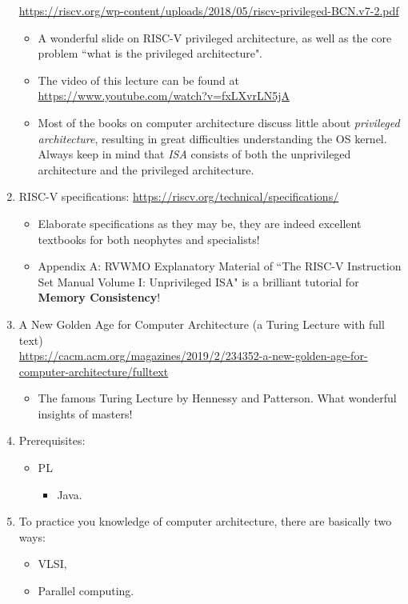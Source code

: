 \documentclass{article}
\begin{document}
\begin{enumerate}
    \href{https://riscv.org/wp-content/uploads/2018/05/riscv-privileged-BCN.v7-2.pdf}{https://riscv.org/wp-content/uploads/2018/05/riscv-privileged-BCN.v7-2.pdf}
    \begin{itemize}
        \item A wonderful slide on RISC-V privileged architecture, as well as the core problem ``what is the privileged architecture".
        \item The video of this lecture can be found at\\ \href{https://www.youtube.com/watch?v=fxLXvrLN5jA}{https://www.youtube.com/watch?v=fxLXvrLN5jA}
        \item Most of the books on computer architecture discuss little about \emph{privileged architecture}, resulting in great difficulties understanding the OS kernel.
        Always keep in mind that \emph{ISA} consists of both the unprivileged architecture and the privileged architecture.
    \end{itemize}
    \item RISC-V specifications:
    \href{https://riscv.org/technical/specifications/}{https://riscv.org/technical/specifications/}
    \begin{itemize}
        \item Elaborate specifications as they may be, they are indeed excellent textbooks for both neophytes and specialists!
        \item Appendix A: RVWMO Explanatory Material of ``The RISC-V Instruction Set Manual Volume I: Unprivileged ISA" is a brilliant tutorial for \textbf{Memory Consistency}!
    \end{itemize}
    \item A New Golden Age for Computer Architecture (a Turing Lecture with full text)\\
    \href{https://cacm.acm.org/magazines/2019/2/234352-a-new-golden-age-for-computer-architecture/fulltext}{https://cacm.acm.org/magazines/2019/2/234352-a-new-golden-age-for-computer-architecture/fulltext}
    \begin{itemize}
        \item The famous Turing Lecture by Hennessy and Patterson.
        What wonderful insights of masters!
    \end{itemize}
    \item Prerequisites:
    \begin{itemize}
        \item PL
        \begin{itemize}
            \item Java.
        \end{itemize}
    \end{itemize}
    \item To practice you knowledge of computer architecture, there are basically two ways:
    \begin{itemize}
        \item VLSI,
        \item Parallel computing.
    \end{itemize}
\end{enumerate}
\end{document}
